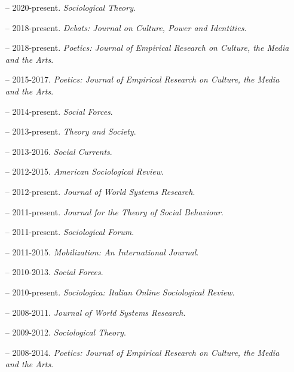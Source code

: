 \begin{itemize}[itemsep=-0.5ex]
    \item[--] 2020-present. {\em Sociological Theory}.
	\item[--] 2018-present. {\em Debats: Journal on Culture, Power and Identities}. 
    \item[--] 2018-present. {\em Poetics: Journal of Empirical Research on Culture, the Media and the Arts}.
    \item[--] 2015-2017. {\em Poetics: Journal of Empirical Research on Culture, the Media and the Arts}.
    \item[--] 2014-present. {\em Social Forces}.
    \item[--] 2013-present.  {\em Theory and Society}.
    \item[--] 2013-2016. {\em Social Currents}.
    \item[--] 2012-2015. {\em American Sociological Review}. 
    \item[--] 2012-present. {\em Journal of World Systems Research}.
    \item[--] 2011-present. {\em Journal for the Theory of Social Behaviour}.
    \item[--] 2011-present. {\em Sociological Forum}.
    \item[--] 2011-2015. {\em Mobilization: An International Journal}.
    \item[--] 2010-2013. {\em Social Forces}.
    \item[--] 2010-present. {\em Sociologica: Italian Online Sociological Review}.
    \item[--] 2008-2011. {\em Journal of World Systems Research}.
    \item[--] 2009-2012. {\em Sociological Theory}.
    \item[--] 2008-2014. {\em Poetics: Journal of Empirical Research on Culture, the Media and the Arts}.
\end{itemize}